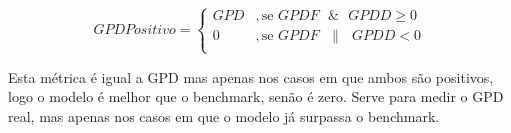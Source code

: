  \begin{equation} \label{eq:gpdpositivo} 
    GPD Positivo = 
    \begin{cases} 
        GPD & , \text{se } GPDF \text{ }\&\text{ } GPDD \geq 0 \\
        0 & , \text{se } GPDF \text{ }\|\text{ } GPDD < 0 \\
    \end{cases} 
\end{equation}
\smallskip


Esta métrica é igual a GPD mas apenas nos casos em que ambos são positivos, logo o modelo é melhor que o benchmark, senão é zero. Serve para medir o GPD real, mas apenas nos casos em que o modelo já surpassa o benchmark.\par
